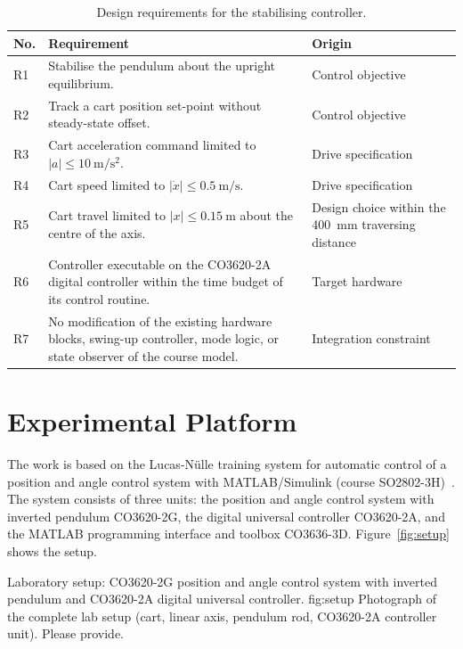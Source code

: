 \begin{table}[ht]
\centering
\caption{Design requirements for the stabilising controller.}
\label{tab:requirements}
\begin{tabular}{p{}p{}p{}}
\toprule
No. & Requirement & Origin \\
\midrule
R1 & Stabilise the pendulum about the upright equilibrium. & Control objective \\
R2 & Track a cart position set-point without steady-state offset. & Control objective \\
R3 & Cart acceleration command limited to $|a| \le 10~\mathrm{m/s^2}$. & Drive specification~\cite{ln_manual} \\
R4 & Cart speed limited to $|\dot{x}| \le 0.5~\mathrm{m/s}$. & Drive specification~\cite{ln_manual} \\
R5 & Cart travel limited to $|x| \le 0.15~\mathrm{m}$ about the centre of the axis. & Design choice within the 400~mm traversing distance \\
R6 & Controller executable on the CO3620-2A digital controller within the time budget of its control routine. & Target hardware \\
R7 & No modification of the existing hardware blocks, swing-up controller, mode logic, or state observer of the course model. & Integration constraint \\
\bottomrule
\end{tabular}
\end{table}

\section{Experimental Platform}
\label{sec:platform}

The work is based on the Lucas-Nülle training system for automatic control of a
position and angle control system with MATLAB/Simulink (course
SO2802-3H)~\cite{ln_manual}. The system consists of three units: the position
and angle control system with inverted pendulum CO3620-2G, the digital
universal controller CO3620-2A, and the MATLAB programming interface and
toolbox CO3636-3D. Figure~\ref{fig:setup} shows the setup.

  {Laboratory setup: CO3620-2G position and angle control system with inverted pendulum and CO3620-2A digital universal controller.}
  {fig:setup}
  {Photograph of the complete lab setup (cart, linear axis, pendulum rod, CO3620-2A controller unit). Please provide.}

